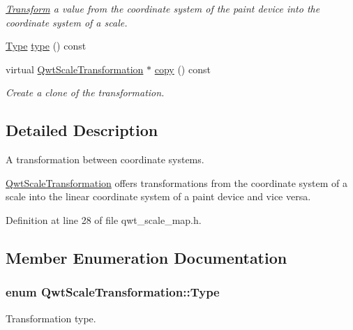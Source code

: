 \begin{DoxyCompactItemize}
\begin{DoxyCompactList}\small\item\em \hyperlink{class_transform}{Transform} a value from the coordinate system of the paint device into the coordinate system of a scale. \end{DoxyCompactList}\item 
\hyperlink{class_qwt_scale_transformation_a5b4e85a0640906586b3180872aaeb786}{Type} \hyperlink{class_qwt_scale_transformation_acc7714bb6b6dbdb588f8170aee700621}{type} () const 
\item 
virtual \hyperlink{class_qwt_scale_transformation}{Qwt\-Scale\-Transformation} $\ast$ \hyperlink{class_qwt_scale_transformation_ace4c90eefe778f87a11e0be1f27df0a6}{copy} () const 
\begin{DoxyCompactList}\small\item\em Create a clone of the transformation. \end{DoxyCompactList}\end{DoxyCompactItemize}


\subsection{Detailed Description}
A transformation between coordinate systems. 

\hyperlink{class_qwt_scale_transformation}{Qwt\-Scale\-Transformation} offers transformations from the coordinate system of a scale into the linear coordinate system of a paint device and vice versa. 

Definition at line 28 of file qwt\-\_\-scale\-\_\-map.\-h.



\subsection{Member Enumeration Documentation}
\hypertarget{class_qwt_scale_transformation_a5b4e85a0640906586b3180872aaeb786}{
\subsubsection[{Type}]{\setlength{\rightskip}{0pt plus 5cm}enum {\bf Qwt\-Scale\-Transformation\-::\-Type}}}\label{class_qwt_scale_transformation_a5b4e85a0640906586b3180872aaeb786}


Transformation type. 

